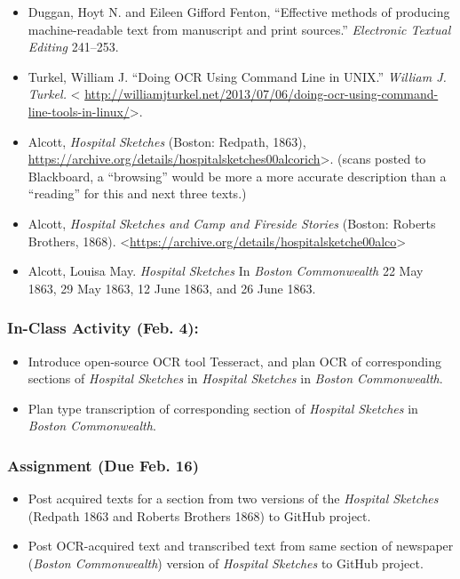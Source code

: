 \documentclass[]{article}
\begin{document}
\begin{itemize}
\itemsep1pt\parskip0pt
\item
  Duggan, Hoyt N. and Eileen Gifford Fenton, ``Effective methods of
  producing machine-readable text from manuscript and print sources.''
  \emph{Electronic Textual Editing} 241--253.
\item
  Turkel, William J. ``Doing OCR Using Command Line in UNIX.''
  \emph{William J. Turkel.} \textless{}
  \url{http://williamjturkel.net/2013/07/06/doing-ocr-using-command-line-tools-in-linux/}\textgreater{}.
\item
  Alcott, \emph{Hospital Sketches} (Boston: Redpath, 1863),
  \url{https://archive.org/details/hospitalsketches00alcorich}\textgreater{}.
  (scans posted to Blackboard, a ``browsing'' would be more a more
  accurate description than a ``reading'' for this and next three
  texts.)
\item
  Alcott, \emph{Hospital Sketches and Camp and Fireside Stories}
  (Boston: Roberts Brothers, 1868).
  \textless{}\url{https://archive.org/details/hospitalsketche00alco}\textgreater{}
\item
  Alcott, Louisa May. \emph{Hospital Sketches} In \emph{Boston
  Commonwealth} 22 May 1863, 29 May 1863, 12 June 1863, and 26 June
  1863.
\end{itemize}

\subsubsection{In-Class Activity (Feb.
4):}\label{in-class-activity-feb.-4}

\begin{itemize}
\itemsep1pt\parskip0pt
\item
  Introduce open-source OCR tool Tesseract, and plan OCR of
  corresponding sections of \emph{Hospital Sketches} in \emph{Hospital
  Sketches} in \emph{Boston Commonwealth}.
\item
  Plan type transcription of corresponding section of \emph{Hospital
  Sketches} in \emph{Boston Commonwealth}.
\end{itemize}

\subsubsection{Assignment (Due Feb. 16)}\label{assignment-due-feb.-16}

\begin{itemize}
\itemsep1pt\parskip0pt
\item
  Post acquired texts for a section from two versions of the
  \emph{Hospital Sketches} (Redpath 1863 and Roberts Brothers 1868) to
  GitHub project.
\item
  Post OCR-acquired text and transcribed text from same section of
  newspaper (\emph{Boston Commonwealth}) version of \emph{Hospital
  Sketches} to GitHub project.
\end{itemize}
\end{document}
